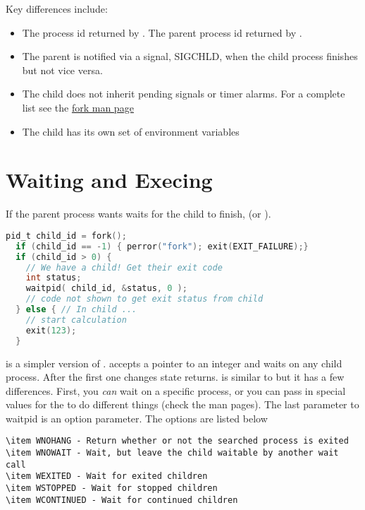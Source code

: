 Key differences include: 
\begin{itemize}
\item The process id returned by . The parent process id returned by . 
\item The parent is notified via a signal, SIGCHLD, when the child process finishes but not vice versa. 
\item The child does not inherit pending signals or timer alarms. For a complete list see the \href{http://man7.org/linux/man-pages/man2/fork.2.html}{fork man page}
\item The child has its own set of environment variables
\end{itemize}

\section{Waiting and Execing}

If the parent process wants waits for the child to finish,  (or ).

\begin{lstlisting}[language=C]
  pid_t child_id = fork();
  if (child_id == -1) { perror("fork"); exit(EXIT_FAILURE);}
  if (child_id > 0) { 
    // We have a child! Get their exit code
    int status; 
    waitpid( child_id, &status, 0 );
    // code not shown to get exit status from child
  } else { // In child ...
    // start calculation
    exit(123);
  }
\end{lstlisting}

 is a simpler version of .
 accepts a pointer to an integer and waits on any child process.
After the first one changes state  returns.
 is similar to  but it has a few differences.
First, you \textit{can} wait on a specific process, or you can pass in special values for the  to do different things (check the man pages).
The last parameter to waitpid is an option parameter. The options are listed below


\begin{lstlisting}
\item WNOHANG - Return whether or not the searched process is exited
\item WNOWAIT - Wait, but leave the child waitable by another wait call
\item WEXITED - Wait for exited children
\item WSTOPPED - Wait for stopped children
\item WCONTINUED - Wait for continued children
\end{lstlisting}

